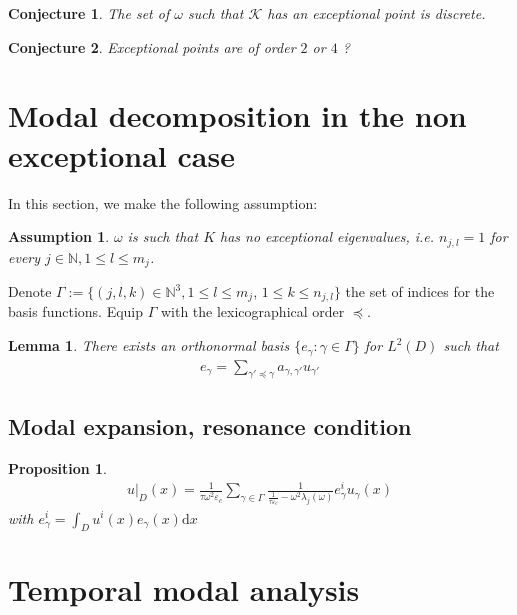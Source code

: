 \documentclass[11pt]{article}
\numberwithin{equation}{section}
\newtheorem{lemma}{Lemma}[section]
\newtheorem{assumption}{Assumption}[section]
\newtheorem{proposition}{Proposition}[section]
\newtheorem{conjecture}{Conjecture}[section]
\newcommand{\N}{\mathbb{N}}
\newcommand{\dd}{\mathrm{d}}
\begin{document}
\begin{conjecture}
The set of $\omega$ such that $\mathcal{K}$ has an exceptional point is discrete.
\end{conjecture}

\begin{conjecture}
Exceptional points are of order $2$ or $4$ ?
\end{conjecture}




\section{Modal decomposition in the non exceptional case}

In this section, we make the following assumption:
\begin{assumption}
$\omega$ is such that $K$ has no exceptional eigenvalues, i.e. $n_{j,l}=1$ for every $j\in \N, 1\leq l \leq m_j$.
\end{assumption}

Denote $\Gamma := \{(j,l,k)\in \mathbb{N}^3,1\leq l \leq m_j$, $1\leq k \leq n_{j,l} \}$ the set of indices for the basis functions. Equip $\Gamma$ with the lexicographical order $\preceq$.
\begin{lemma}There exists an orthonormal basis $\{e_\gamma : \gamma \in \Gamma\}$ for $L^2(D)$ such that 
\begin{align*}
e_\gamma=\sum_{\gamma'\preceq \gamma} a_{\gamma,\gamma'} u_{\gamma'}
\end{align*}
\end{lemma}

\subsection{Modal expansion, resonance condition}

\begin{proposition}\label{prop:expansion}
\begin{align*}
u\big\vert_D (x) = \frac{1}{\tau \omega^2 \varepsilon_c} \sum_{\gamma \in \Gamma} \frac{1}{\frac{1}{\tau \varepsilon_c }-\omega^2 \lambda_j(\omega)}e_\gamma^i u_\gamma(x)
\end{align*}
with $e_\gamma^i = \int_D u^i(x) e_\gamma(x) \dd x$
\end{proposition}

\section{Temporal modal analysis}
\end{document}
